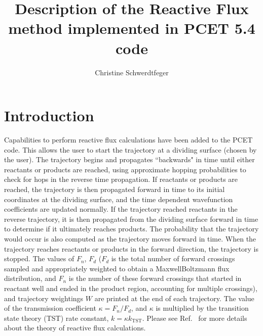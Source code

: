 \documentclass[aps,amsfonts,amsmath,amssymb,onecolumn,tightenlines,notitlepage]{revtex4-2}
\begin{document}
\title{Description of the Reactive Flux method implemented in PCET 5.4 code}

\author{Christine Schwerdtfeger}


\maketitle %

\section{Introduction}
%
Capabilities to perform reactive flux calculations have been added to the PCET code. This allows the user to start the trajectory at a dividing surface (chosen by the user).  The trajectory begins and propagates ``backwards" in time until either reactants or products are reached, using approximate hopping probabilities to check for hops in the reverse time propagation.  If reactants or products are reached, the trajectory is then propagated forward in time to its initial coordinates at the dividing surface, and the time dependent wavefunction coefficients are updated normally.  If the trajectory reached reactants in the reverse trajectory, it is then propagated from the dividing surface forward in time to determine if it ultimately reaches products.  The probability that the trajectory would occur is also computed as the trajectory moves forward in time. When the trajectory reaches reactants or products in the forward direction, the trajectory is stopped.  The values of $F_n$, $F_d$ ($F_d$ is the total number of forward crossings sampled and appropriately weighted to obtain a MaxwellBoltzmann flux distribution, and $F_n$ is the number of these forward crossings that started in reactant well and ended in the product region, accounting for multiple crossings), and trajectory weightings $W$ are printed at the end of each trajectory.  The value of the transmission coefficient $\kappa = F_n/F_d$, and $\kappa$ is multiplied by the transition state theory (TST) rate constant, $k=\kappa k_\text{TST}$. Please see Ref.~ for more details about the theory of reactive flux calculations.
\end{document}
